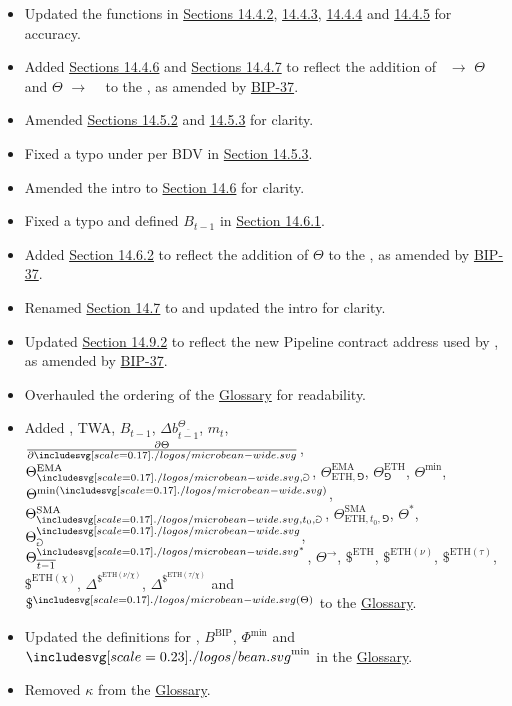 \documentclass[class=article, crop=false]{standalone}
\begin{document}
\begin{itemize}[topsep=0pt, itemsep=3pt,leftmargin=16pt]
\begin{itemize}
        \item Updated the  functions in \hyperlink{subsubsection.14.4.2}{Sections 14.4.2}, \hyperlink{subsubsection.14.4.3}{14.4.3}, \hyperlink{subsubsection.14.4.4}{14.4.4} and \hyperlink{subsubsection.14.4.5}{14.4.5} for accuracy.
        \item Added \hyperlink{subsubsection.14.4.6}{Sections 14.4.6} and \hyperlink{subsubsection.14.4.7}{Sections 14.4.7} to reflect the addition of \Bean\ $\rightarrow$ $\Theta$ and $\Theta$ $\rightarrow$ \Bean\  to the , as amended by \href{https://bean.money/bip-37}{BIP-37}.
        \item Amended \hyperlink{subsubsection.14.5.2}{Sections 14.5.2} and \hyperlink{subsubsection.14.5.3}{14.5.3} for clarity.
        \item Fixed a typo under  per BDV in \hyperlink{subsubsection.14.5.3}{Section 14.5.3}. 
        \item Amended the intro to \hyperlink{subsection.14.6}{Section 14.6} for clarity.
        \item Fixed a typo and defined $B_{t-1}$ in \hyperlink{subsubsection.14.6.1}{Section 14.6.1}.
        \item Added \hyperlink{subsubsection.14.6.2}{Section 14.6.2} to reflect the addition of $\Theta$ to the , as amended by \href{https://bean.money/bip-37}{BIP-37}.
        \item Renamed \hyperlink{subsection.14.7}{Section 14.7} to  and updated the intro for clarity.
        \item Updated \hyperlink{subsubsection.14.9.2}{Section 14.9.2} to reflect the new Pipeline contract address used by , as amended by \href{https://bean.money/bip-37}{BIP-37}.
        \item Overhauled the ordering of the \hyperlink{subsection.14.11}{Glossary} for readability.
        \item Added , TWA, $B_{t-1}$, $\Delta b_{\overline{t-1}}^{\Theta}$, $m_t$, $\frac{\partial \Theta}{\partial \bean}$, $\Theta^{\text{EMA}}_{\bean,\Game}$, $\Theta^{\text{EMA}}_{\text{ETH},\Game}$, $\Theta_{\Game}^{\text{ETH}}$, $\Theta^{\text{min}}$, $\Theta^{\text{min}(\bean)}$, $\Theta^{\text{SMA}}_{\bean,t_0,\Game}$, $\Theta^{\text{SMA}}_{\text{ETH},t_0,\Game}$, $\Theta^{*}$, $\Theta_{\Game}^{\bean}$, $\Theta_{\overline{t-1}}^{{\bean}^*}$, $\Theta^{\rightarrow}$, $\$^{\text{ETH}}$, $\$^{\text{ETH}(\nu)}$, $\$^{\text{ETH}(\tau)}$, $\$^{\text{ETH}(\chi)}$, $\Delta^{\$^{\text{ETH}(\nu \slash \chi)}}$, $\Delta^{\$^{\text{ETH}(\tau \slash \chi)}}$ and $\$^{\bean(\Theta)}$ to the \hyperlink{subsection.14.11}{Glossary}.
        \item Updated the definitions for , $B^{\text{BIP}}$, $\Phi^{\text{min}}$ and $\Bean^{\text{min}}$ in the \hyperlink{subsection.14.11}{Glossary}.
        \item Removed $\kappa$ from the \hyperlink{subsection.14.11}{Glossary}.
    \end{itemize}
\end{itemize}
\end{document}
